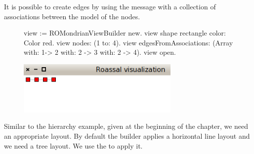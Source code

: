 \documentclass[a4paper,10pt,twoside]{book}
\begin{document}


It is possible to create edges by using the  message with a collection of associations between the model of the nodes.

\begin{figure}[H]
      \begin{minipage}[t]{1\textwidth}
      \vspace{0pt}
\begin{code}{}
view := ROMondrianViewBuilder new.
view shape rectangle 
	color: Color red.
view nodes: (1 to: 4).
view 
	edgesFromAssociations: (Array with: 1-> 2 with: 2 -> 3 with: 2 -> 4).
view open.
\end{code}
   \end{minipage}
   \hfill
   \begin{minipage}[t]{1\textwidth}
	 \vspace{0pt} \raggedright
       \centering
		\includegraphics[width=0.7\textwidth]{mondrian5}
   \end{minipage}
\label{fig:mondrian5}
\end{figure} 



Similar to the  hierarchy example, given at the beginning of the chapter, we need an appropriate layout. By default the builder applies a horizontal line layout and we need a tree layout. We use the  to apply it.
\end{document}
